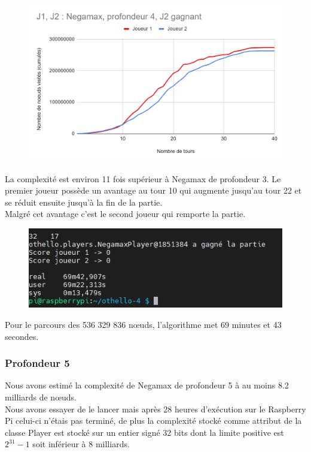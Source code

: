 \documentclass[12pt]{article}
\begin{document}
\begin{figure}[!h]
   \includegraphics[width=\textwidth]{prof4negamax.png}
\end{figure}

La complexité est environ 11 fois supérieur à Negamax de profondeur 3. Le premier joueur possède un avantage au tour 10 qui augmente jusqu’au tour 22 et se réduit ensuite jusqu’à la fin de la partie.\\
Malgré cet avantage c’est le second joueur qui remporte la partie.

\begin{figure}[!h]
   \includegraphics[width=\textwidth]{prof4negamax-console.png}
\end{figure}

Pour le parcours des 536 329 836 nœuds, l’algorithme met 69 minutes et 43 secondes. 

\subsubsection{Profondeur 5}

Nous avons estimé la complexité de Negamax de profondeur 5 à au moins 8.2 milliards de nœuds.\\
Nous avons essayer de le lancer mais après 28 heures d’exécution sur le Raspberry Pi celui-ci n’étais pas terminé, de plus la complexité stocké comme attribut de la classe Player est stocké sur un entier signé 32 bits dont la limite positive est $2^{31} - 1$ soit inférieur à 8 milliards.
\end{document}
